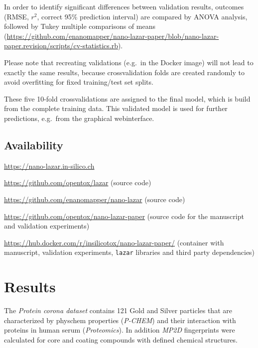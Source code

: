 \documentclass[utf8]{frontiersHLTH} %
\makeatletter
\providecommand{\tightlist}{%
  \setlength{\itemsep}{0pt}\setlength{\parskip}{0pt}}
\newenvironment{description}
	{\list{}{\labelwidth\z@ \itemindent-\leftmargin
		\let\makelabel\descriptionlabel}}
	{\endlist}
\newcommand*\descriptionlabel[1]{\hspace\labelsep
	\normalfont\bfseries #1}
\makeatother
\begin{document}
In order to identify significant differences between validation results,
outcomes (RMSE, \(r^2\), correct 95\% prediction interval) are compared
by ANOVA analysis, followed by Tukey multiple comparisons of means
(\url{https://github.com/enanomapper/nano-lazar-paper/blob/nano-lazar-paper.revision/scripts/cv-statistics.rb}).

Please note that recreating validations (e.g.~in the Docker image) will
not lead to exactly the same results, because crossvalidation folds are
created randomly to avoid overfitting for fixed training/test set
splits.

These five 10-fold crossvalidations are assigned to the final model,
which is build from the complete training data. This validated model is
used for further predictions, e.g.~from the graphical webinterface.

\subsection{Availability}\label{availability}

\begin{description}
\tightlist
\item[Public webinterface]
\url{https://nano-lazar.in-silico.ch}
\item[\texttt{lazar} framework]
\url{https://github.com/opentox/lazar} (source code)
\item[\texttt{nano-lazar} GUI]
\url{https://github.com/enanomapper/nano-lazar} (source code)
\item[Manuscript]
\url{https://github.com/opentox/nano-lazar-paper} (source code for the
manuscript and validation experiments)
\item[Docker image]
\url{https://hub.docker.com/r/insilicotox/nano-lazar-paper/} (container
with manuscript, validation experiments, \texttt{lazar} libraries and
third party dependencies)
\end{description}

\section{Results}\label{results}

The \emph{Protein corona dataset} contains 121 Gold and Silver particles
that are characterized by physchem properties (\emph{P-CHEM}) and their
interaction with proteins in human serum (\emph{Proteomics}). In
addition \emph{MP2D} fingerprints were calculated for core and coating
compounds with defined chemical structures.
\end{document}
